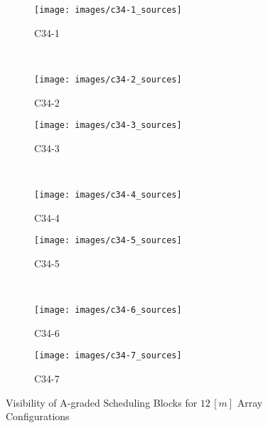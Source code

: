 \begin{figure}
        \centering
        \begin{subfigure}[b]{0.45\textwidth}
                \texttt{[image: images/c34-1\_sources]}
                \caption{C34-1} 
        \end{subfigure} 
        ~ %
%
        \begin{subfigure}[b]{0.45\textwidth}
                \texttt{[image: images/c34-2\_sources]}
                \caption{C34-2}
        \end{subfigure}

        \begin{subfigure}[b]{0.45\textwidth}
                \texttt{[image: images/c34-3\_sources]}
                \caption{C34-3}
        \end{subfigure}
        ~ 
        \begin{subfigure}[b]{0.45\textwidth}
                \texttt{[image: images/c34-4\_sources]}
                \caption{C34-4}
        \end{subfigure}%
        
        \begin{subfigure}[b]{0.45\textwidth}
                \texttt{[image: images/c34-5\_sources]}
                \caption{C34-5}
        \end{subfigure}
        ~
        \begin{subfigure}[b]{0.45\textwidth}
                \texttt{[image: images/c34-6\_sources]}
                \caption{C34-6}
        \end{subfigure}
        
        \begin{subfigure}[b]{0.45\textwidth}
                \texttt{[image: images/c34-7\_sources]}
                \caption{C34-7}
        \end{subfigure}           
        \caption{Visibility of A-graded Scheduling Blocks for $12\,[m]$ Array Configurations}
		\label{fig:results-sb-critical-set}
\end{figure}
